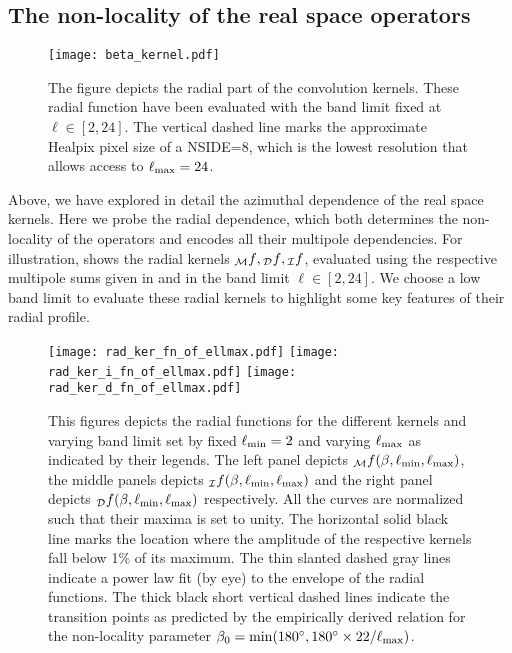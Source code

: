 \subsection{The non-locality of the real space operators} \label{sec:radial_locality}
%
\begin{figure}[t]
\centering
\texttt{[image: beta\_kernel.pdf]}
\caption{The figure depicts the radial part of the convolution kernels. These radial function have been evaluated with the band limit fixed at $\ell \in [2,24]$. The vertical dashed line marks the approximate Healpix pixel size of a NSIDE=8, which is the lowest resolution that allows access to $\ell_{\rm max}=24$.}
\label{fig:beta_kernel}
\end{figure}
%
Above, we have explored in detail the  azimuthal dependence of the real space kernels.  Here we probe the radial dependence, which both  determines the non-locality of the operators and encodes all their multipole dependencies. For illustration,  shows the radial kernels ${_{\mathcal{M}}f}, {_{\mathcal{D}}f},{_{\mathcal{I}}f}$, evaluated using the respective multipole sums given in  and  in the band limit $\ell \in [2,24]$. We choose a low band limit to evaluate these radial kernels to highlight some key features of their radial profile.
%
\begin{figure}[t]
\texttt{[image: rad\_ker\_fn\_of\_ellmax.pdf]}\hfill
\texttt{[image: rad\_ker\_i\_fn\_of\_ellmax.pdf]}\hfill
\texttt{[image: rad\_ker\_d\_fn\_of\_ellmax.pdf]}
\caption{This figures depicts the radial functions for the different kernels and varying band limit set by fixed $\ell_{\rm min}=2$ and varying $\ell_{\rm max}$ as indicated by their legends. The left panel depicts ${_{\mathcal{M}}f}(\beta,\ell_{\rm min},\ell_{\rm max})$, the middle panels depicts ${}_{\mathcal{I}}f(\beta,\ell_{\rm min},\ell_{\rm max})$ and the right panel depicts ${}_{\mathcal{D}}f(\beta,\ell_{\rm min},\ell_{\rm max})$ respectively. All the curves are normalized such that their maxima is set to unity. The horizontal solid black line marks the location where the amplitude of the respective kernels fall below 1\% of its maximum. The thin slanted dashed gray lines indicate a power law fit (by eye) to the envelope of the radial functions. The thick black short vertical dashed lines indicate the transition points as predicted by the empirically derived relation for the non-locality parameter $\beta_0={\rm min}(180^\circ,180^\circ \times 22/\ell_{\rm max})$.}
\label{fig:rad_ker_decay}
\end{figure}
%

